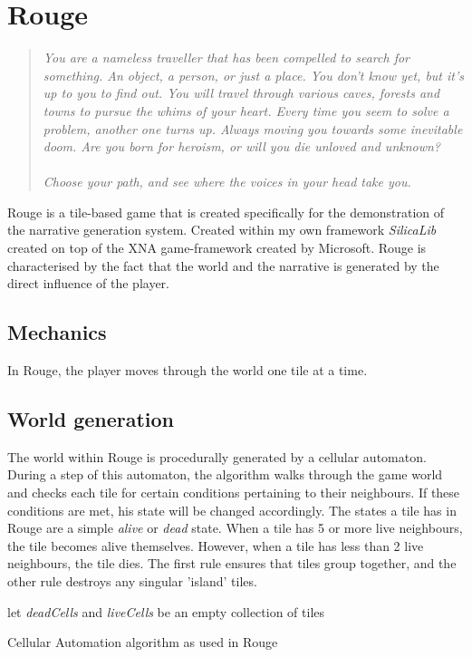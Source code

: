 \chapter{Rouge}
\begin{quotation}
\textsl{You are a nameless traveller that has been compelled to search for something. An object, a person, or just a place. You don't know yet, but it's up to you to find out. You will travel through various caves, forests and towns to pursue the whims of your heart. Every time you seem to solve a problem, another one turns up. Always moving you towards some inevitable doom. Are you born for heroism, or will you die unloved and unknown? \\\\Choose your path, and see where the voices in your head take you.}
\end{quotation}
Rouge is a \rogue tile-based game that is created specifically for the demonstration of the \diage narrative generation system. Created within my own framework \textit{SilicaLib} created on top of the XNA game-framework created by Microsoft. Rouge is characterised by the fact that the world and the narrative is generated by the direct influence of the player.

\section{Mechanics}
In Rouge, the player moves through the world one tile at a time. 

\section{World generation}
The world within Rouge is procedurally generated by a cellular automaton. During a step of this automaton, the algorithm walks through the game world and checks each tile for certain conditions pertaining to their neighbours. If these conditions are met, his state will be changed accordingly. The states a tile has in Rouge are a simple \textit{alive} or \textit{dead} state. When a tile has 5 or more live neighbours, the tile becomes alive themselves. However, when a tile has less than 2 live neighbours, the tile dies. The first rule ensures that tiles group together, and the other rule destroys any singular 'island' tiles.

\begin{algorithm}
	let \textit{deadCells} and \textit{liveCells} be an empty collection of tiles\;
	\caption{Cellular Automation algorithm as used in Rouge}\label{alg:ca}
\end{algorithm}

